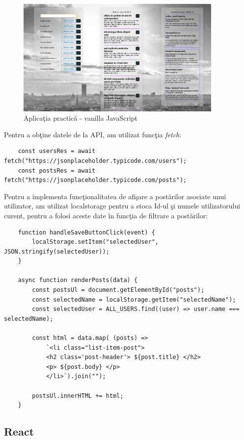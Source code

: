 \documentclass[12pt, a4paper]{report}
\begin{document}
\begin{figure}[htbp]
	\centering
	\includegraphics[width=0.9\textwidth]{01_desktop_preview.png}
	\caption{Aplica\c tia practic\u a - vanilla JavaScript}
	\label{fig:preview-vanillajs}
\end{figure}

Pentru a ob\c tine datele de la API, am utilizat func\c tia  \emph{fetch}:
\begin{lstlisting}
	const usersRes = await fetch("https://jsonplaceholder.typicode.com/users");
	const postsRes = await fetch("https://jsonplaceholder.typicode.com/posts");
\end{lstlisting}

Pentru a implementa func\c tionalitatea de afi\c sare a post\u arilor asociate unui utilizator, am utilizat localstorage pentru a stoca Id-ul \c si numele utilizatorului curent, pentru a folosi aceste date \^in func\c tia de filtrare a post\u arilor:
\begin{lstlisting}
	function handleSaveButtonClick(event) {
		localStorage.setItem("selectedUser", JSON.stringify(selectedUser));
	}

	async function renderPosts(data) {
		const postsUl = document.getElementById("posts");
		const selectedName = localStorage.getItem("selectedName");
  		const selectedUser = ALL_USERS.find((user) => user.name === selectedName);

		const html = data.map( (posts) => 
			`<li class="list-item-post"> 
			<h2 class='post-header'> ${post.title} </h2>
			<p> ${post.body} </p>
			</li>`).join("");

	  	postsUl.innerHTML += html;
	}

\end{lstlisting}
\subsection{React}
\end{document}
